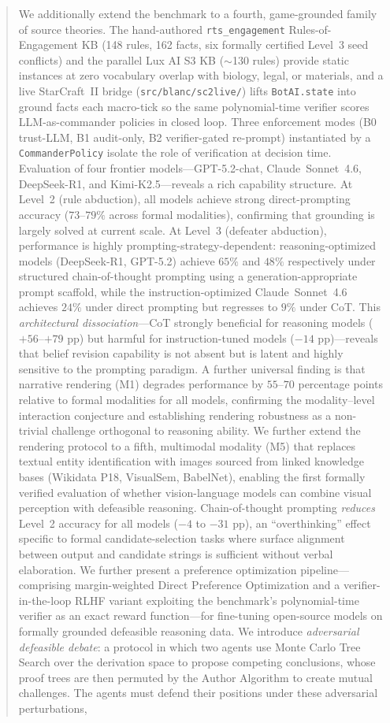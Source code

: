 \documentclass{article}
\theoremstyle{definition}
\begin{document}
\begin{abstract}
We additionally extend the benchmark to a fourth, game-grounded family of source theories. The hand-authored \texttt{rts\_engagement} Rules-of-Engagement KB (148 rules, 162 facts, six formally certified Level~3 seed conflicts) and the parallel Lux AI S3 KB ($\sim$130 rules) provide static instances at zero vocabulary overlap with biology, legal, or materials, and a live StarCraft~II bridge (\texttt{src/blanc/sc2live/}) lifts \texttt{BotAI.state} into ground facts each macro-tick so the same polynomial-time verifier scores LLM-as-commander policies in closed loop. Three enforcement modes (B0 trust-LLM, B1 audit-only, B2 verifier-gated re-prompt) instantiated by a \texttt{CommanderPolicy} isolate the role of verification at decision time. Evaluation of four frontier models---GPT-5.2-chat, Claude~Sonnet~4.6, DeepSeek-R1, and Kimi-K2.5---reveals a rich capability structure. At Level~2 (rule abduction), all models achieve strong direct-prompting accuracy ($73$--$79\%$ across formal modalities), confirming that grounding is largely solved at current scale. At Level~3 (defeater abduction), performance is highly prompting-strategy-dependent: reasoning-optimized models (DeepSeek-R1, GPT-5.2) achieve $65\%$ and $48\%$ respectively under structured chain-of-thought prompting using a generation-appropriate prompt scaffold, while the instruction-optimized Claude~Sonnet~4.6 achieves $24\%$ under direct prompting but regresses to $9\%$ under CoT. This \emph{architectural dissociation}---CoT strongly beneficial for reasoning models ($+56$--$+79$ pp) but harmful for instruction-tuned models ($-14$ pp)---reveals that belief revision capability is not absent but is latent and highly sensitive to the prompting paradigm. A further universal finding is that narrative rendering (M1) degrades performance by $55$--$70$ percentage points relative to formal modalities for all models, confirming the modality--level interaction conjecture and establishing rendering robustness as a non-trivial challenge orthogonal to reasoning ability. We further extend the rendering protocol to a fifth, multimodal modality (M5) that replaces textual entity identification with images sourced from linked knowledge bases (Wikidata P18, VisualSem, BabelNet), enabling the first formally verified evaluation of whether vision-language models can combine visual perception with defeasible reasoning. Chain-of-thought prompting \emph{reduces} Level~2 accuracy for all models ($-4$ to $-31$ pp), an ``overthinking'' effect specific to formal candidate-selection tasks where surface alignment between output and candidate strings is sufficient without verbal elaboration. We further present a preference optimization pipeline---comprising margin-weighted Direct Preference Optimization and a verifier-in-the-loop RLHF variant exploiting the benchmark's polynomial-time verifier as an exact reward function---for fine-tuning open-source models on formally grounded defeasible reasoning data. We introduce \emph{adversarial defeasible debate}: a protocol in which two agents use Monte Carlo Tree Search over the derivation space to propose competing conclusions, whose proof trees are then permuted by the Author Algorithm to create mutual challenges. The agents must defend their positions under these adversarial perturbations, 
\end{abstract}
\end{document}
